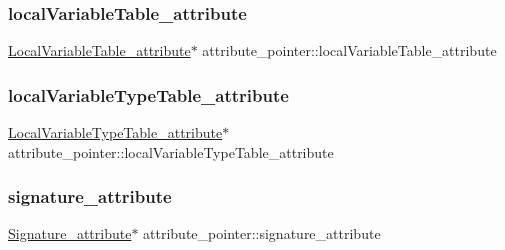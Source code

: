 \hypertarget{unionattribute__pointer_a80c50f643d3d69ccee07e33445d8622a}{}\label{unionattribute__pointer_a80c50f643d3d69ccee07e33445d8622a} 
\subsubsection{\texorpdfstring{local\+Variable\+Table\+\_\+attribute}{localVariableTable\_attribute}}
{\footnotesize\ttfamily \hyperlink{struct_local_variable_table__attribute}{Local\+Variable\+Table\+\_\+attribute}$\ast$ attribute\+\_\+pointer\+::local\+Variable\+Table\+\_\+attribute}

\hypertarget{unionattribute__pointer_aa4cb0de3753d905a41d7b4c8acb32b6b}{}\label{unionattribute__pointer_aa4cb0de3753d905a41d7b4c8acb32b6b} 
\subsubsection{\texorpdfstring{local\+Variable\+Type\+Table\+\_\+attribute}{localVariableTypeTable\_attribute}}
{\footnotesize\ttfamily \hyperlink{struct_local_variable_type_table__attribute}{Local\+Variable\+Type\+Table\+\_\+attribute}$\ast$ attribute\+\_\+pointer\+::local\+Variable\+Type\+Table\+\_\+attribute}

\hypertarget{unionattribute__pointer_a2b70c1eb93cfc0cf9ad2070fe4ba3441}{}\label{unionattribute__pointer_a2b70c1eb93cfc0cf9ad2070fe4ba3441} 
\subsubsection{\texorpdfstring{signature\+\_\+attribute}{signature\_attribute}}
{\footnotesize\ttfamily \hyperlink{struct_signature__attribute}{Signature\+\_\+attribute}$\ast$ attribute\+\_\+pointer\+::signature\+\_\+attribute}

